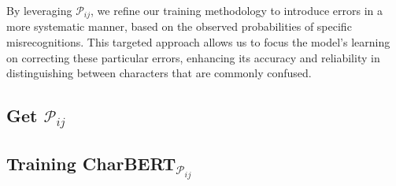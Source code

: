 By leveraging $\mathcal{P}_{ij}$, we refine our training methodology to introduce errors in a more systematic manner, based on the observed probabilities of specific misrecognitions. This targeted approach allows us to focus the model's learning on correcting these particular errors, enhancing its accuracy and reliability in distinguishing between characters that are commonly confused.

\subsection{Get $\mathcal{P}_{ij}$}
\label{subsec:3_get_pij}

\subsection{Training CharBERT$_{\mathcal{P}_{ij}}$}
\label{subsec:3_training_charbert_pij}